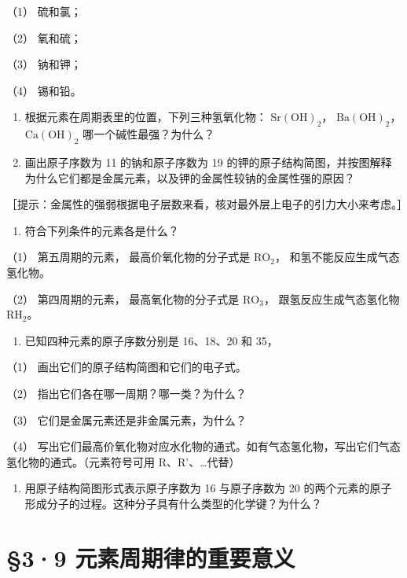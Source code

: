 （1） 硫和氯；

（2） 氧和硫；

（3） 钠和钾；

（4） 锡和铅。

\begin{enumerate}[start=3]
\item
  根据元素在周期表里的位置，下列三种氢氧化物： \(\mathrm{Sr(OH)}_{2}\)，
  \(\mathrm{Ba(OH)}_{2}\)， \(\mathrm{Ca(OH)}_{2}\)
  哪一个碱性最强？为什么？
\item
  画出原子序数为 11 的钠和原子序数为 19
  的钾的原子结构简图，并按图解释为什么它们都是金属元素，以及钾的金属性较钠的金属性强的原因？
\end{enumerate}

［提示：金属性的强弱根据电子层数来看，核对最外层上电子的引力大小来考虑。］

\begin{enumerate}[start=5]
\item
  符合下列条件的元素各是什么？
\end{enumerate}

（1） 第五周期的元素， 最高价氧化物的分子式是 \(\mathrm{RO}_{2}\)，
和氢不能反应生成气态氢化物。

（2） 第四周期的元素， 最高氧化物的分子式是 \(\mathrm{RO}_{3}\)，
跟氢反应生成气态氢化物 \(\mathrm{RH}_{2}\)。

\begin{enumerate}[start=6]
\item
  已知四种元素的原子序数分别是 16、18、20 和 35，
\end{enumerate}

（1） 画出它们的原子结构简图和它们的电子式。

（2） 指出它们各在哪一周期？哪一类？为什么？

（3） 它们是金属元素还是非金属元素，为什么？

（4）
写出它们最高价氧化物对应水化物的通式。如有气态氢化物，写出它们气态氢化物的通式。（元素符号可用
R、R'、\ldots 代替）

\begin{enumerate}[start=7]
\item
  用原子结构简图形式表示原子序数为 16 与原子序数为 20
  的两个元素的原子形成分子的过程。这种分子具有什么类型的化学键？为什么？
\end{enumerate}

\section{§3·9 元素周期律的重要意义}

